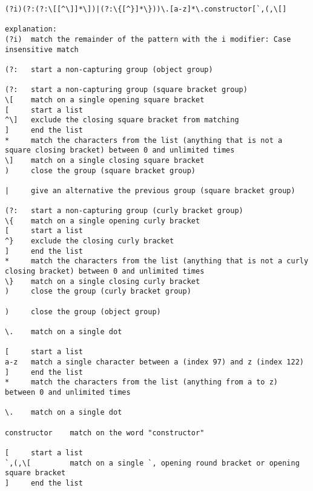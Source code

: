 \begin{lstlisting}[style=basicStyle, caption=Regular expression of proposed rule id:2, label={lst:constructorsruleproposalregexA}]
(?i)(?:(?:\[[^\]]*\])|(?:\{[^}]*\}))\.[a-z]*\.constructor[`,(,\[]

explanation:
(?i)  match the remainder of the pattern with the i modifier: Case insensitive match

(?:   start a non-capturing group (object group)

(?:   start a non-capturing group (square bracket group)
\[    match on a single opening square bracket
[     start a list
^\]   exclude the closing square bracket from matching
]     end the list
*     match the characters from the list (anything that is not a square closing bracket) between 0 and unlimited times
\]    match on a single closing square bracket
)     close the group (square bracket group)

|     give an alternative the previous group (square bracket group)

(?:	  start a non-capturing group (curly bracket group)
\{	  match on a single opening curly bracket
[     start a list
^}	  exclude the closing curly bracket
]     end the list
*     match the characters from the list (anything that is not a curly closing bracket) between 0 and unlimited times
\}	  match on a single closing curly bracket
)     close the group (curly bracket group)

)     close the group (object group)

\.    match on a single dot

[     start a list
a-z   match a single character between a (index 97) and z (index 122)
]     end the list
*     match the characters from the list (anything from a to z) between 0 and unlimited times

\.	  match on a single dot

constructor    match on the word "constructor"

[     start a list
`,(,\[         match on a single `, opening round bracket or opening square bracket
]     end the list
\end{lstlisting}



